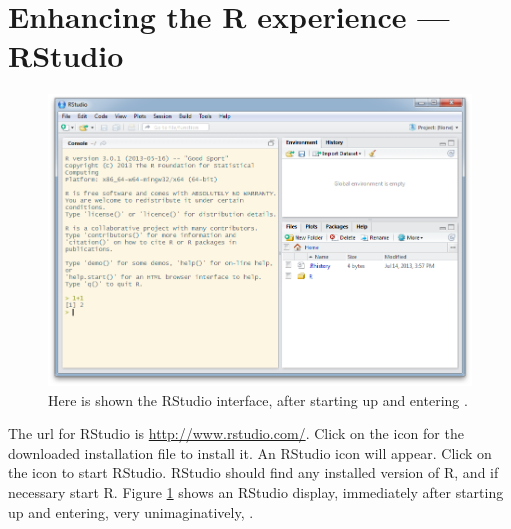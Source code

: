 \section{Enhancing the R experience --- RStudio}\label{sec:RStudio}

\begin{figure}
\includegraphics{figs-inc/03i-all4.png}
\caption{Here is shown the RStudio interface, after starting up and
  entering .}\label{fig:rstudio}
\end{figure}

The url for RStudio is \url{http://www.rstudio.com/}.  Click on the
icon for the downloaded installation file to install it. An RStudio
icon will appear.  Click on the icon to start RStudio.  RStudio should
find any installed version of R, and if necessary start R.  Figure
\ref{fig:rstudio} shows an RStudio display, immediately after starting
up and entering, very unimaginatively, .

